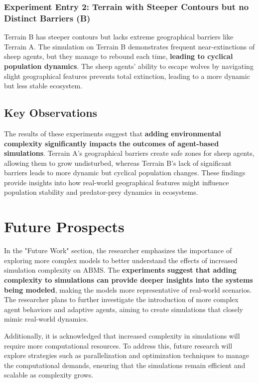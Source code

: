 \documentclass[12pt,a4paper]{article}
\begin{document}
\subsubsection{Experiment Entry 2: Terrain with Steeper Contours but no Distinct Barriers (B)}
Terrain B has steeper contours but lacks extreme geographical barriers like Terrain A. The simulation on Terrain B demonstrates frequent near-extinctions of sheep agents, but they manage to rebound each time, \textbf{leading to cyclical population dynamics}. The sheep agents' ability to escape wolves by navigating slight geographical features prevents total extinction, leading to a more dynamic but less stable ecosystem.

\subsection{Key Observations}
The results of these experiments suggest that \textbf{adding environmental complexity significantly impacts the outcomes of agent-based simulations}. Terrain A's geographical barriers create safe zones for sheep agents, allowing them to grow undisturbed, whereas Terrain B's lack of significant barriers leads to more dynamic but cyclical population changes. These findings provide insights into how real-world geographical features might influence population stability and predator-prey dynamics in ecosystems.

\section{Future Prospects}

In the "Future Work" section, the researcher emphasizes the importance of exploring more complex models to better understand the effects of increased simulation complexity on ABMS. The \textbf{experiments suggest that adding complexity to simulations can provide deeper insights into the systems being modeled}, making the models more representative of real-world scenarios. The researcher plans to further investigate the introduction of more complex agent behaviors and adaptive agents, aiming to create simulations that closely mimic real-world dynamics.

Additionally, it is acknowledged that increased complexity in simulations will require more computational resources. To address this, future research will explore strategies such as parallelization and optimization techniques to manage the computational demands, ensuring that the simulations remain efficient and scalable as complexity grows.
\end{document}
